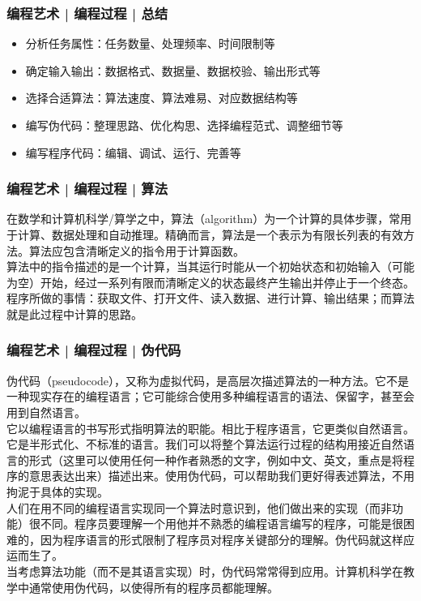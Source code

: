 \begin{frame}
  \frametitle{编程艺术 | 编程过程 | \alert{总结}}
  \begin{itemize}
    \item 分析任务属性：任务数量、处理频率、时间限制等
    \item 确定输入输出：数据格式、数据量、数据校验、输出形式等
    \item 选择合适算法：算法速度、算法难易、对应数据结构等
    \item 编写伪代码：整理思路、优化构思、选择编程范式、调整细节等
    \item 编写程序代码：编辑、调试、运行、完善等
  \end{itemize}
\end{frame}

\begin{frame}
  \frametitle{编程艺术 | 编程过程 | 算法}
  在数学和计算机科学/算学之中，算法（algorithm）为一个\alert{计算的具体步骤}，常用于计算、数据处理和自动推理。精确而言，算法是一个表示为有限长列表的有效方法。算法应包含清晰定义的指令用于计算函数。\\
  \vspace{1em}
  算法中的指令描述的是一个计算，当其运行时能从一个初始状态和初始输入（可能为空）开始，经过一系列有限而清晰定义的状态最终产生输出并停止于一个终态。\\
  \vspace{1em}
  程序所做的事情：获取文件、打开文件、读入数据、进行计算、输出结果；而算法就是此过程中\alert{计算的思路}。
\end{frame}

\begin{frame}
  \frametitle{编程艺术 | 编程过程 | 伪代码}
伪代码（pseudocode），又称为虚拟代码，是高层次描述算法的一种方法。它不是一种现实存在的编程语言；它可能综合使用多种编程语言的语法、保留字，甚至会用到自然语言。\\
  \vspace{0.8em}
它以编程语言的书写形式指明算法的职能。相比于程序语言，它更类似自然语言。它是半形式化、不标准的语言。我们可以将整个算法运行过程的结构用接近自然语言的形式（这里可以使用任何一种作者熟悉的文字，例如中文、英文，重点是将程序的意思表达出来）描述出来。使用伪代码，可以帮助我们更好得表述算法，不用拘泥于具体的实现。\\
  \vspace{0.8em}
人们在用不同的编程语言实现同一个算法时意识到，他们做出来的实现（而非功能）很不同。程序员要理解一个用他并不熟悉的编程语言编写的程序，可能是很困难的，因为程序语言的形式限制了程序员对程序关键部分的理解。伪代码就这样应运而生了。\\
  \vspace{0.8em}
  当考虑算法功能（而不是其语言实现）时，伪代码常常得到应用。计算机科学在教学中通常使用伪代码，以使得所有的程序员都能理解。
\end{frame}

